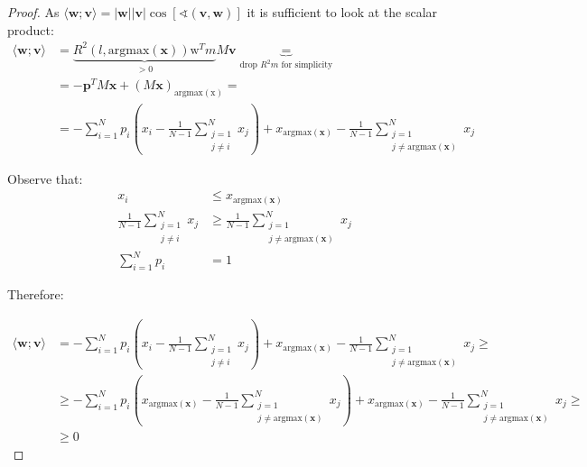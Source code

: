 \documentclass{article}
\theoremstyle{remark}
\begin{document}
\begin{proof}
As $\langle \mathbf{w}; \mathbf{v} \rangle = |\mathbf{w}||\mathbf{v}|\cos [\sphericalangle(\mathbf{v}, \mathbf{w})]$ it is sufficient to look at the scalar product:
\begin{align}
\langle \mathbf{w}; \mathbf{v} \rangle &= \underbrace{R^2 (l, \mathrm{argmax}(\mathbf{x})) \mathrm{w}^T m}_{> 0}M \mathbf{v} \underbrace{=}_{\text{drop $R^2 m$ for simplicity}}\\
&= - \mathbf{p}^T M \mathbf{x} + (M\mathbf{x})_{\mathrm{argmax}(\mathrm{x})} = \\
&= - \sum_{i=1}^{N} p_i \left(x_i - \frac{1}{N-1}\sum_{\substack{ j=1 \\ j \neq i}}^N x_j\right) + x_{\mathrm{argmax}(\mathbf{x})} - \frac{1}{N-1} \sum_{\substack{ j=1 \\ j \neq \mathrm{argmax}(\mathbf{x})}}^N x_j
\end{align}

Observe that:
\begin{align}
x_i &\leq x_{\mathrm{argmax}(\mathbf{x})} \\
\frac{1}{N-1}\sum_{\substack{ j=1 \\ j \neq i}}^N x_j &\geq \frac{1}{N-1} \sum_{\substack{ j=1 \\ j \neq \mathrm{argmax}(\mathbf{x})}}^N x_j \\
\sum_{i=1}^{N} p_i &= 1
\end{align}

Therefore:

\begin{align}
\langle \mathbf{w}; \mathbf{v} \rangle &= - \sum_{i=1}^{N} p_i \left(x_i - \frac{1}{N-1}\sum_{\substack{ j=1 \\ j \neq i}}^N x_j\right) + x_{\mathrm{argmax}(\mathbf{x})} - \frac{1}{N-1} \sum_{\substack{ j=1 \\ j \neq \mathrm{argmax}(\mathbf{x})}}^N x_j \geq \\
& \geq - \sum_{i=1}^{N} p_i \left(x_{\mathrm{argmax}(\mathbf{x})} - \frac{1}{N-1}\sum_{\substack{ j=1 \\ j \neq {\mathrm{argmax}(\mathbf{x})}}}^N x_j\right) + x_{\mathrm{argmax}(\mathbf{x})} - \frac{1}{N-1} \sum_{\substack{ j=1 \\ j \neq \mathrm{argmax}(\mathbf{x})}}^N x_j \geq \\
& \geq 0
\end{align}

\end{proof}
\end{document}

